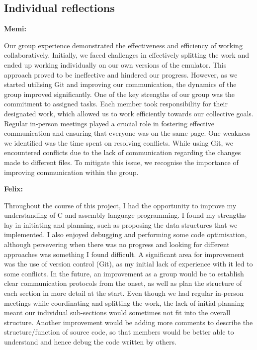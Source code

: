 \documentclass{article}
\begin{document}
\subsection{Individual reflections}

\textbf{Memi: }

Our group experience demonstrated the effectiveness and efficiency of working collaboratively. Initially, we faced challenges in effectively splitting the work and ended up working individually on our own versions of the emulator. This approach proved to be ineffective and hindered our progress. However, as we started utilising Git and improving our communication, the dynamics of the group improved significantly. One of the key strengths of our group was the commitment to assigned tasks. Each member took responsibility for their designated work, which allowed us to work efficiently towards our collective goals. Regular in-person meetings played a crucial role in fostering effective communication and ensuring that everyone was on the same page. One weakness we identified was the time spent on resolving conflicts. While using Git, we encountered conflicts due to the lack of communication regarding the changes made to different files. To mitigate this issue, we recognise the importance of improving communication within the group. 

\textbf{Felix:}

Throughout the course of this project, I had the opportunity to improve my understanding of C and assembly language programming. I found my strengths lay in initiating and planning, such as proposing the data structures that we implemented. I also enjoyed debugging and performing some code optimisation, although persevering when there was no progress and looking for different approaches was something I found difficult. A significant area for improvement was the use of version control (Git), as my initial lack of experience with it led to some conflicts. In the future, an improvement as a group would be to establish clear communication protocols from the onset, as well as plan the structure of each section in more detail at the start. Even though we had regular in-person meetings while coordinating and splitting the work, the lack of initial planning meant our individual sub-sections would sometimes not fit into the overall structure. Another improvement would be adding more comments to describe the structure/function of source code, so that members would be better able to understand and hence debug the code written by others. 
\end{document}
